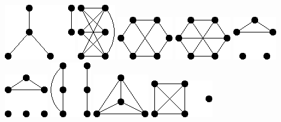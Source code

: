 \documentclass[11pt,paper=b5,footinclude,headinclude]{scrbook} %
\theoremstyle{remark}
\theoremstyle{definition} %
\theoremstyle{theorem} %
\begin{document}
\includegraphics[scale=0.5,frame]{smallGraphs/g_K2Uclaw.png}     
\includegraphics[scale=0.5,frame]{smallGraphs/g_K33+e.png}     
\includegraphics[scale=0.5,frame]{smallGraphs/g_K33-e.png}     
\includegraphics[scale=0.5,frame]{smallGraphs/g_K33.png}     
\includegraphics[scale=0.5,frame]{smallGraphs/g_K3U2K1.png}     
\includegraphics[scale=0.5,frame]{smallGraphs/g_K3U3K1.png}     
\includegraphics[scale=0.5,frame]{smallGraphs/g_K3UP3.png}     
\includegraphics[scale=0.5,frame]{smallGraphs/g_K4.png}     
\includegraphics[scale=0.5,frame]{smallGraphs/g_K4UK1.png}     
\end{document}
